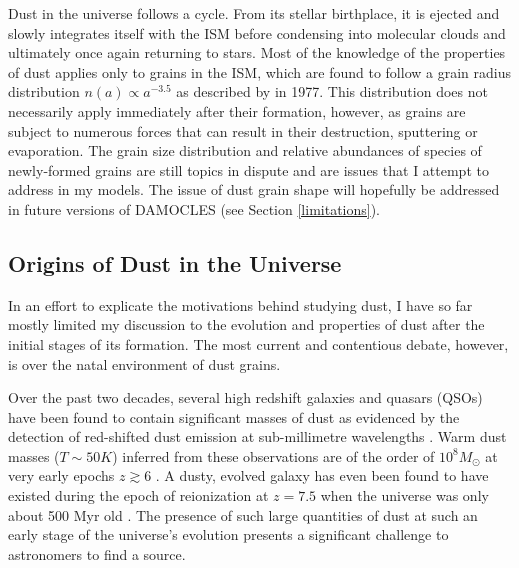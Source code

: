 Dust in the universe follows a cycle.  From its stellar birthplace, it is ejected and slowly integrates itself with the ISM before condensing into molecular clouds and ultimately once again returning to stars.  Most of the knowledge of the properties of dust applies only to grains in the ISM, which are found to follow a grain radius distribution $n(a) \propto a^{-3.5}$ as described by \citeauthor{Mathis1977} in 1977.  This distribution does not necessarily apply immediately after their formation, however, as grains are subject to numerous forces that can result in their destruction, sputtering or evaporation.  The grain size distribution and relative abundances of species of newly-formed grains are still topics in dispute and are issues that I attempt to address in my models.  The issue of dust grain shape will hopefully be addressed in future versions of DAMOCLES (see Section \ref{limitations}).


\subsection{Origins of Dust in the Universe}
In an effort to explicate the motivations behind studying dust, I have so far mostly limited my discussion to the evolution and properties of dust after the initial stages of its formation.  The most current and contentious debate, however, is over the natal environment of dust grains.  

Over the past two decades, several high redshift galaxies and quasars (QSOs) have been found to contain significant masses of dust as evidenced by the detection of red-shifted dust emission at sub-millimetre wavelengths \citep{Carilli2001, Omont2001, Bertoldi2002, Bertoldi2003, Watson2015}.  Warm dust masses ($T\sim50K$) inferred from these observations are of the order of $10^8M_{\odot}$ at very early epochs $z \gtrsim 6$ \citep{Robson2004,Beelen2006,Dwek2007}.  A dusty, evolved galaxy has even been found to have existed during the epoch of reionization at $z=7.5$ when the universe was only about 500 Myr old \citep{Watson2015}.  The presence of such large quantities of dust at such an early stage of the universe's evolution presents a significant challenge to astronomers to find a source.  

